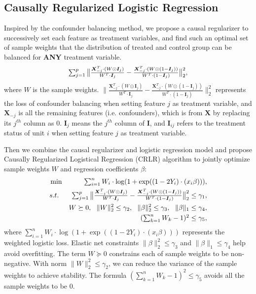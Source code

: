 \documentclass[sigconf]{acmart}
\newcommand*{\Scale}[2][4]{\scalebox{#1}{$#2$}}
\begin{document}
\subsection{Causally Regularized Logistic Regression}\label{sec:CRLR}
Inspired by the confounder balancing method, we propose a causal regularizer to successively set each feature as treatment variables, and find such an optimal set of sample weights that the distribution of treated and control group can be balanced for \textbf{ANY} treatment variable.
\begin{eqnarray}
    \label{causal_regularizer}
    \Scale[1.0]{\sum_{j=1}^{p} \big\|\frac{\bm{X}_{-j}^{T}\cdot(W\odot \bm{I}_j)}{W^{T}\cdot \bm{I}_j}-\frac{\bm{X}_{-j}^{T}\cdot(W\odot (1-\bm{I}_j))}{W^{T}\cdot (1-\bm{I}_j)}\big\|_2^2},
\end{eqnarray}
where $W$ is the sample weights.
$\big\|\frac{\bm{X}_{-j}^{T}\cdot(W\odot \bm{I}_j)}{W^{T}\cdot \bm{I}_j}-\frac{\bm{X}_{-j}^{T}\cdot(W\odot (1-\bm{I}_j))}{W^{T}\cdot (1-\bm{I}_j)}\big\|_2^2$ represents the loss of confounder balancing when setting feature $j$ as treatment variable, and $\bm{X}_{-j}$ is all the remaining features (i.e. confounders), which is from $\bm{X}$ by replacing its $j^{th}$ column as $0$.
$\bm{I}_j$ means the $j^{th}$ column of $\bm{I}$, and $\bm{I}_{ij}$ refers to the treatment status of unit $i$ when setting feature $j$ as treatment variable.

Then we combine the causal regularizer and logistic regression model and propose Causally Regularized Logistical Regression (CRLR) algorithm to jointly optimize sample weights $W$ and regression coefficients $\beta$:
\begin{eqnarray}
\label{eq:causal_classification_model}
&\min& \Scale[1.0]{\sum_{i=1}^{n}W_i\cdot \log(1+\exp((1-2Y_i)\cdot (x_i\beta)))},\\
\nonumber &s.t.& \Scale[1.0]{\sum_{j=1}^{p} \big\|\frac{\bm{X}_{-j}^{T}\cdot(W\odot \bm{I}_j)}{W^{T}\cdot \bm{I}_j}-\frac{\bm{X}_{-j}^{T}\cdot(W\odot (1-\bm{I}_j))}{W^{T}\cdot (1-\bm{I}_j)}\big\|_2^2 \leq \gamma_1},\\
\nonumber   &\quad& W\succeq 0, \ \ \|W\|_2^2 \leq \gamma_2, \ \  \|\beta\|_2^2 \leq \gamma_3, \ \  \|\beta\|_1 \leq \gamma_4,\\
\nonumber &\quad& \Scale[1.0]{(\sum_{k=1}^{n}W_k-1)^{2} \leq \gamma_5},
\end{eqnarray}
where $\sum_{i=1}^{n}W_i\cdot \log(1+\exp((1-2Y_i)\cdot (x_i\beta)))$ represents the weighted logistic loss.
Elastic net constraints $\|\beta\|_2^2\leq \gamma_3$ and $\|\beta\|_1\leq \gamma_4$ help avoid overfitting.
The term $W\succeq 0$ constrains each of sample weights to be non-negative.
With norm $\|W\|_2^2\leq \gamma_2$, we can reduce the variance of the sample weights to achieve stability.
The formula $(\sum_{k=1}^{n}W_k-1)^{2} \leq \gamma_5$ avoids all the sample weights to be $0$.
\end{document}
